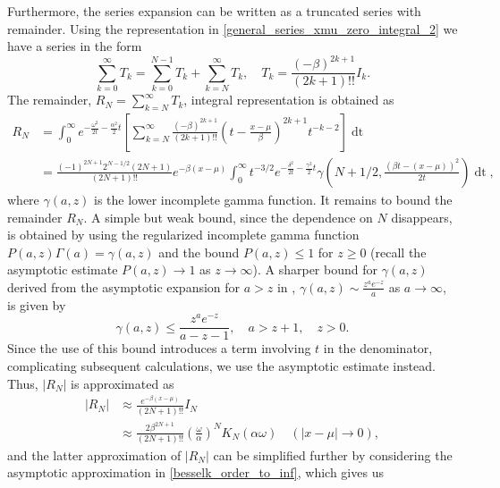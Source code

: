\documentclass[10pt,a4paper,oneside]{article}
\numberwithin{equation}{section}
\begin{document}
Furthermore, the series expansion can be written as a truncated series with remainder. Using the representation in \eqref{general_series_xmu_zero_integral_2} we have a series in the form
\begin{equation}
\sum_{k=0}^{\infty} T_k = \sum_{k=0}^{N-1}T_k + \sum_{k=N}^{\infty} T_k, \quad T_k = \frac{(-\beta)^{2k+1}}{(2k+1)!!} I_k.
\end{equation}
The remainder, $R_N = \sum_{k=N}^{\infty} T_k$, integral representation is obtained as
\begin{align}\label{general_xmu_remainder_integral}
R_N &= \int_0^{\infty} e^{-\frac{\omega^2}{2t} - \frac{\alpha^2}{2}t} \left[ \sum_{k=N}^{\infty}\frac{(-\beta)^{2k+1}}{(2k+1)!!} \left(t - \frac{x-\mu}{\beta}\right)^{2k+1} t^{-k-2}\right] \mathop{dt}\\
&= \frac{(-1)^{2N + 1} 2^{N - 1/2} (2N + 1)}{(2N + 1)!!} e^{-\beta(x-\mu)} \int_0^{\infty} t^{-3/2} e^{-\frac{\delta^2}{2t} - \frac{\gamma^2}{2}t} \gamma\left(N + 1/2 , \frac{(\beta t - (x-\mu))^2}{2t}\right) \mathop{dt},
\end{align}
where $\gamma(a, z)$ is the lower incomplete gamma function. It remains to bound the remainder $R_N$. A simple but weak bound, since the dependence on $N$ disappears, is obtained by using the regularized incomplete gamma function $P(a,z) \Gamma(a) = \gamma(a, z)$ and the bound $P(a, z) \le 1$ for $z \ge 0$ (recall the asymptotic estimate $P(a,z) \to 1$ as $z \to \infty$). A sharper bound for $\gamma(a, z)$ derived from the asymptotic expansion for $a > z$ in \cite[\S 7.3]{Temme2015}, $\gamma(a, z) \sim \frac{z^a e^{-z}}{a}$ as $a \to \infty$, is given by
\begin{equation}\label{lower_incomplete_gamma_bound}
\gamma(a, z) \le \frac{z^a e^{-z}}{a - z - 1}, \quad a > z + 1, \quad z > 0.
\end{equation}
Since the use of this bound introduces a term involving $t$ in the denominator, complicating subsequent calculations, we use the asymptotic estimate instead. Thus, $|R_N|$ is approximated as
\begin{align}
|R_N| &\approx \frac{e^{-\beta(x-\mu)}}{(2N + 1)!!} I_N \label{remainder_approx1}\\
&\approx \frac{2 \beta^{2N + 1}}{(2N + 1)!!}\left(\frac{\omega}{\alpha}\right)^N K_N(\alpha \omega) \quad (|x-\mu| \to 0) \label{remainder_approx2},
\end{align}
and the latter approximation of $|R_N|$ can be simplified further by considering the asymptotic approximation in \eqref{besselk_order_to_inf}, which gives us
\end{document}
